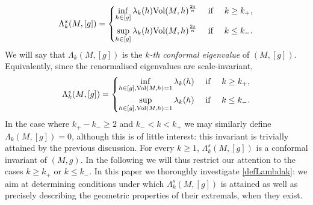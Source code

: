 \documentclass[10pt]{amsart}
\numberwithin{equation}{section}
\def\La{{\Lambda}}
\def\la{{\lambda}}
\def\Vol{{\mathop{\rm Vol}}}
\theoremstyle{plain}
\theoremstyle{remark}
\begin{document}
\begin{equation} \label{defLambdak}
\La_k^s(M,[g]) = \left \{ \begin{aligned}
                            \inf_{h \in [g]} \la_k(h) \Vol(M,h)^{\frac{2s}{n}} & \quad \hbox{ if } &   k \geq k_+ ,\\
                             \sup_{h \in [g]} \la_k(h) \Vol(M,h)^{\frac{2s}{n}} & \quad \hbox{ if } & k \leq k_- .
                           \end{aligned} \right. 
                           \end{equation}
We will say that $\Lambda_k(M,[g])$ is the \emph{$k$-th conformal eigenvalue} of $(M,[g])$. Equivalently, since the renormalised eigenvalues are scale-invariant,
$$\La_k^s(M,[g]) = \left \{ \begin{aligned}
                            \inf_{h \in [g],  \Vol(M,h)=1} \la_k(h)  &\quad \hbox{ if } &   k \geq k_+ , \\
                             \sup_{h \in [g],  \Vol(M,h)=1} \la_k(h)  & \quad  \hbox{ if } & k \leq k_- .
                           \end{aligned} \right. $$
                           In the case where $k_+-k_- \ge 2$ and $k_- < k < k_+$ we may similarly define $\Lambda_k(M,[g]) = 0$, although this is of little interest: this invariant is trivially attained by the previous discussion. For every $k \ge 1$, $\Lambda_k^s(M,[g])$ is a conformal invariant of $(M,g)$. In the following we will thus restrict our attention to the cases $k \ge k_+$ or $k \le k_-$. In this paper we thoroughly investigate \eqref{defLambdak}: we aim at determining conditions under which $\La_k^s(M,[g])$ is attained as well as precisely describing the geometric properties of their extremals, when they exist. 
                           
\medskip
\end{document}
